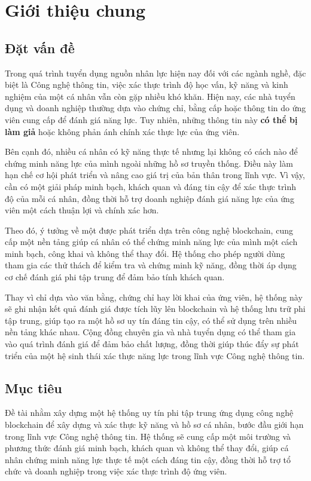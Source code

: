 \chapter{Giới thiệu chung}

\section{Đặt vấn đề}

Trong quá trình tuyển dụng nguồn nhân lực hiện nay đối với các ngành nghề, đặc biệt là Công nghệ thông tin,
việc xác thực trình độ học vấn, kỹ năng và kinh nghiệm của một cá nhân vẫn còn gặp nhiều khó khăn.
Hiện nay, các nhà tuyển dụng và doanh nghiệp thường dựa vào chứng chỉ, bằng cấp hoặc thông tin do ứng viên cung cấp để đánh giá năng lực.
Tuy nhiên, những thông tin này \textbf{có thể bị làm giả} hoặc không phản ánh chính xác thực lực của ứng viên.

Bên cạnh đó, nhiều cá nhân có kỹ năng thực tế nhưng lại không có cách nào để chứng minh năng lực của mình ngoài những hồ sơ truyền thống.
Điều này làm hạn chế cơ hội phát triển và nâng cao giá trị của bản thân trong lĩnh vực.
Vì vậy, cần có một giải pháp minh bạch, khách quan và đáng tin cậy để xác thực trình độ của mỗi cá nhân,
đồng thời hỗ trợ doanh nghiệp đánh giá năng lực của ứng viên một cách thuận lợi và chính xác hơn.

Theo đó, ý tưởng về một \textbf{\thesisname} được phát triển dựa trên công nghệ blockchain,
cung cấp một nền tảng giúp cá nhân có thể chứng minh năng lực của mình một cách minh bạch, công khai và không thể thay đổi.
Hệ thống cho phép người dùng tham gia các thử thách để kiểm tra và chứng minh kỹ năng, đồng thời áp dụng cơ chế đánh giá phi tập trung để đảm bảo tính khách quan.

Thay vì chỉ dựa vào văn bằng, chứng chỉ hay lời khai của ứng viên, hệ thống này sẽ ghi nhận kết quả đánh giá được tích lũy lên blockchain và hệ thống lưu trữ phi tập trung,
giúp tạo ra một hồ sơ uy tín đáng tin cậy, có thể sử dụng trên nhiều nền tảng khác nhau.
Cộng đồng chuyên gia và nhà tuyển dụng có thể tham gia vào quá trình đánh giá để đảm bảo chất lượng,
đồng thời giúp thúc đẩy sự phát triển của một hệ sinh thái xác thực năng lực trong lĩnh vực Công nghệ thông tin.

\section{Mục tiêu}

Đề tài nhằm xây dựng một hệ thống uy tín phi tập trung ứng dụng công nghệ blockchain để xây dựng và xác thực kỹ năng và hồ sơ cá nhân, bước đầu giới hạn trong lĩnh vực Công nghệ thông tin.
Hệ thống sẽ cung cấp một môi trường và phương thức đánh giá minh bạch, khách quan và không thể thay đổi, giúp cá nhân chứng minh năng lực thực tế một cách đáng tin cậy,
đồng thời hỗ trợ tổ chức và doanh nghiệp trong việc xác thực trình độ ứng viên.

